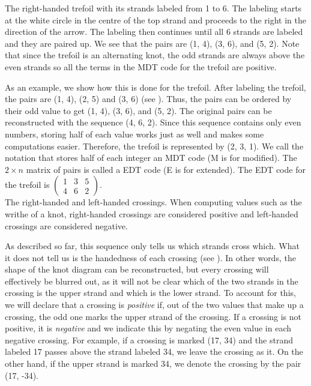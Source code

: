 \begin{paper}
{\begin{center}\end{center}}
{The right-handed trefoil with its strands labeled from 1 to
6.
The labeling starts at the white circle in the centre of the top strand and
proceeds to the right in the direction of the arrow.
The labeling then continues until all 6 strands are labeled and they are paired
up.
We see that the pairs are (1, 4), (3, 6), and (5, 2).
Note that since the trefoil is an alternating knot, the odd strands are always
above the even strands so all the terms in the MDT code for the trefoil are
positive.}

As an example, we show how this is done for the trefoil.
After labeling the trefoil, the pairs are (1, 4), (2, 5) and (3, 6) (see
\figLabeled).
Thus, the pairs can be ordered by their odd value to get (1, 4), (3, 6), and
(5, 2).
The original pairs can be reconstructed with the sequence (4, 6, 2).
Since this sequence contains only even numbers, storing half of each value works
just as well and makes some computations easier.
Therefore, the trefoil is represented by (2, 3, 1).
We call the notation that stores half of each integer an MDT code (M is for
modified).
The $2\times n$ matrix of pairs is called a EDT code (E is for extended).
The EDT code for the trefoil is $\begin{pmatrix}1&3&5\\4&6&2\end{pmatrix}$.\\

{The right-handed and left-handed crossings.
When computing values such as the writhe of a knot, right-handed crossings are
considered positive and left-handed crossings are considered negative.}


As described so far, this sequence only tells us which strands cross which.
What it does not tell us is the handedness of each crossing (see \figCrossings).
In other words, the shape of the knot diagram can be reconstructed, but every
crossing will effectively be blurred out, as it will not be clear which of the
two strands in the crossing is the upper strand and which is the lower strand.
To account for this, we will declare that a crossing is \textit{positive} if,
out of the two values that make up a crossing, the odd one marks the upper
strand of the crossing.
If a crossing is not positive, it is \textit{negative} and we indicate this by
negating the even value in each negative crossing.
For example, if a crossing is marked (17, 34) and the strand labeled 17 passes
above the strand labeled 34, we leave the crossing as it.
On the other hand, if the upper strand is marked 34, we denote the crossing by
the pair (17, -34).


\end{paper}

